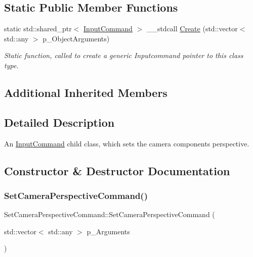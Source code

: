 \subsection*{Static Public Member Functions}
\begin{DoxyCompactItemize}
\item 
static std\+::shared\+\_\+ptr$<$ \mbox{\hyperlink{class_input_command}{Input\+Command}} $>$ \+\_\+\+\_\+stdcall \mbox{\hyperlink{class_set_camera_perspective_command_afa8c4690696eec2fd17af44eb7894086}{Create}} (std\+::vector$<$ std\+::any $>$ p\+\_\+\+Object\+Arguments)
\begin{DoxyCompactList}\small\item\em Static function, called to create a generic Inputcommand pointer to this class type. \end{DoxyCompactList}\end{DoxyCompactItemize}
\subsection*{Additional Inherited Members}


\subsection{Detailed Description}
An \mbox{\hyperlink{class_input_command}{Input\+Command}} child class, which sets the camera component\textquotesingle{}s perspective. 

\subsection{Constructor \& Destructor Documentation}
\mbox{\label{class_set_camera_perspective_command_ae548893e7f8fcf7d1406ebeec580dead}} 
\subsubsection{\texorpdfstring{SetCameraPerspectiveCommand()}{SetCameraPerspectiveCommand()}}
{\footnotesize\ttfamily Set\+Camera\+Perspective\+Command\+::\+Set\+Camera\+Perspective\+Command (\begin{DoxyParamCaption}\item[{std\+::vector$<$ std\+::any $>$}]{p\+\_\+\+Arguments }\end{DoxyParamCaption})\hspace{0.3cm}{\ttfamily [inline]}}



